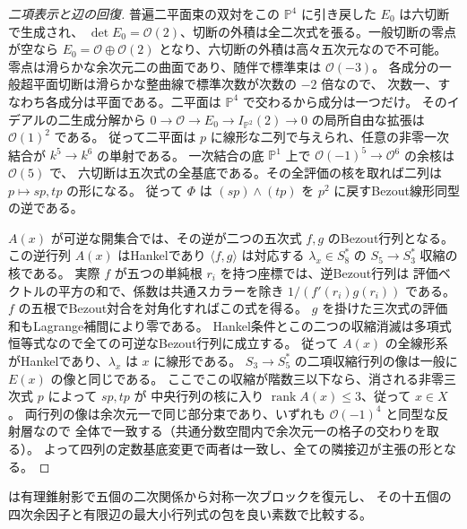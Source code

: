 \begin{proof}[二項表示と辺の回復]
普遍二平面束の双対をこの $\mathbb P^4$ に引き戻した $E_0$ は六切断で生成され、
$\det E_0=\mathcal O(2)$、切断の外積は全二次式を張る。一般切断の零点が空なら
$E_0=\mathcal O\oplus\mathcal O(2)$ となり、六切断の外積は高々五次元なので不可能。
零点は滑らかな余次元二の曲面であり、随伴で標準束は $\mathcal O(-3)$。
各成分の一般超平面切断は滑らかな整曲線で標準次数が次数の $-2$ 倍なので、
次数一、すなわち各成分は平面である。二平面は $\mathbb P^4$ で交わるから成分は一つだけ。
そのイデアルの二生成分解から $0\to\mathcal O\to E_0\to I_{\mathbb P^2}(2)\to0$
の局所自由な拡張は $\mathcal O(1)^2$ である。
従って二平面は $p$ に線形な二列で与えられ、任意の非零一次結合が $k^5\to k^6$ の単射である。
一次結合の底 $\mathbb P^1$ 上で $\mathcal O(-1)^5\to\mathcal O^6$ の余核は $\mathcal O(5)$ で、
六切断は五次式の全基底である。その全評価の核を取れば二列は $p\mapsto s p,t p$ の形になる。
従って $\Phi$ は $(sp)\wedge(tp)$ を $p^2$ に戻すBezout線形同型の逆である。

$A(x)$ が可逆な開集合では、その逆が二つの五次式 $f,g$ のBezout行列となる。
この逆行列 $A(x)$ はHankelであり $\langle f,g\rangle$ は対応する
$\lambda_x\in S_8^*$ の $S_5\to S_3^*$ 収縮の核である。
実際 $f$ が五つの単純根 $r_i$ を持つ座標では、逆Bezout行列は
評価ベクトルの平方の和で、係数は共通スカラーを除き $1/(f'(r_i)g(r_i))$ である。
$f$ の五根でBezout対合を対角化すればこの式を得る。
$g$ を掛けた三次式の評価和もLagrange補間により零である。
Hankel条件とこの二つの収縮消滅は多項式恒等式なので全ての可逆なBezout行列に成立する。
従って $A(x)$ の全線形系がHankelであり、$\lambda_x$ は $x$ に線形である。
$S_3\to S_5^*$ の二項収縮行列の像は一般に $E(x)$ の像と同じである。
ここでこの収縮が階数三以下なら、消される非零三次式 $p$ によって $sp,tp$ が
中央行列の核に入り $\operatorname{rank}A(x)\le3$、従って $x\in X$。
両行列の像は余次元一で同じ部分束であり、いずれも $\mathcal O(-1)^4$ と同型な反射層なので
全体で一致する（共通分数空間内で余次元一の格子の交わりを取る）。
よって四列の定数基底変更で両者は一致し、全ての隣接辺が主張の形となる。
\end{proof}
 は有理錐射影で五個の二次関係から対称一次ブロックを復元し、
その十五個の四次余因子と有限辺の最大小行列式の包を良い素数で比較する。

